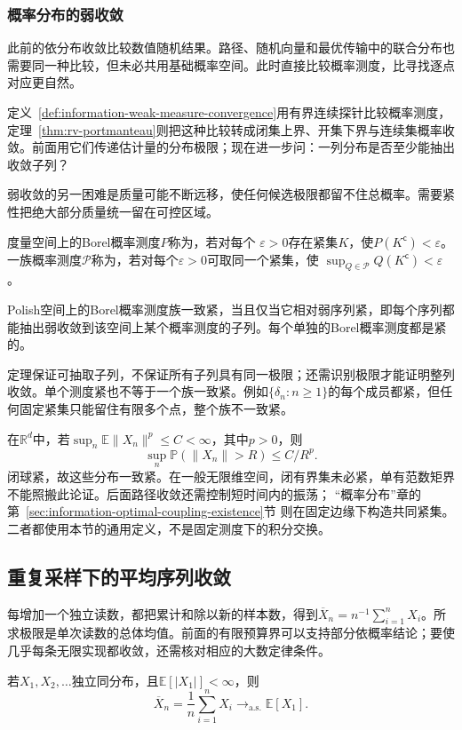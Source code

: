 \subsubsection{概率分布的弱收敛}
\label{sec:rv-weak-convergence}
此前的依分布收敛比较数值随机结果。路径、随机向量和最优传输中的联合分布也需要同一种比较，但未必共用基础概率空间。此时直接比较概率测度，比寻找逐点对应更自然。

定义~\ref{def:information-weak-measure-convergence}用有界连续探针比较概率测度，定理~\ref{thm:rv-portmanteau}则把这种比较转成闭集上界、开集下界与连续集概率收敛。前面用它们传递估计量的分布极限；现在进一步问：一列分布是否至少能抽出收敛子列？

弱收敛的另一困难是质量可能不断远移，使任何候选极限都留不住总概率。需要紧性把绝大部分质量统一留在可控区域。
\begin{definition}[紧概率测度与一致紧族]
\label{def:information-tightness}
度量空间上的Borel概率测度\(P\)称为，若对每个
\(\varepsilon>0\)存在紧集\(K\)，使\(P(K^{\mathsf c})<\varepsilon\)。
一族概率测度\(\mathcal P\)称为，若对每个\(\varepsilon>0\)可取同一个紧集，使
\(\sup_{Q\in\mathcal P}Q(K^{\mathsf c})<\varepsilon\)。
\end{definition}
\begin{theorem}[Prokhorov定理]
\label{thm:rv-prokhorov}
Polish空间上的Borel概率测度族一致紧，当且仅当它相对弱序列紧，即每个序列都能抽出弱收敛到该空间上某个概率测度的子列。每个单独的Borel概率测度都是紧的。
\end{theorem}
定理保证可抽取子列，不保证所有子列具有同一极限；还需识别极限才能证明整列收敛。单个测度紧也不等于一个族一致紧。例如\(\{\delta_n:n\geq1\}\)的每个成员都紧，但任何固定紧集只能留住有限多个点，整个族不一致紧。

在\(\mathbb R^d\)中，若\(\sup_n\mathbb E\|X_n\|^p\leq C<\infty\)，其中\(p>0\)，则
\[
\sup_n\mathbb P(\|X_n\|>R)\leq C/R^p.
\]
闭球紧，故这些分布一致紧。在一般无限维空间，闭有界集未必紧，单有范数矩界不能照搬此论证。后面路径收敛还需控制短时间内的振荡；
“概率分布”章的第~\ref{sec:information-optimal-coupling-existence}节
则在固定边缘下构造共同紧集。二者都使用本节的通用定义，不是固定测度下的积分交换。

\subsection{重复采样下的平均序列收敛}

每增加一个独立读数，都把累计和除以新的样本数，得到\(\overline X_n=n^{-1}\sum_{i=1}^nX_i\)。所求极限是单次读数的总体均值。前面的有限预算界可以支持部分依概率结论；要使几乎每条无限实现都收敛，还需核对相应的大数定律条件。
\label{sec:rv-aggregate-limits}
\begin{theorem}[强大数定律]
\label{thm:probability-strong-law-large-numbers}
若\(X_1,X_2,\ldots\)独立同分布，且\(\mathbb{E}[|X_1|]<\infty\)，则
\[ \overline{X}_n
  =\frac{1}{n}\sum_{i=1}^{n}X_i\to_{\mathrm{a.s.}}\mathbb{E}[X_1]. \]
\end{theorem}

